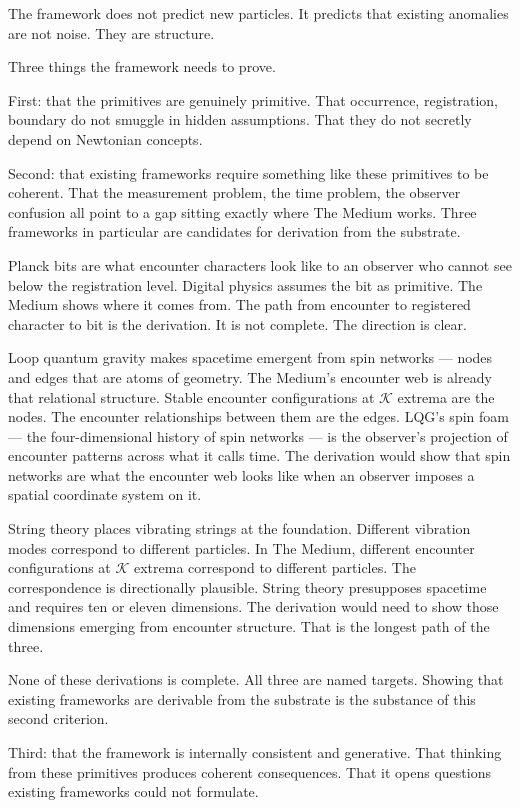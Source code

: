 \documentclass[11pt,letterpaper]{article}
\newcommand{\Kappa}{\mathcal{K}}
\begin{document}
The framework does not predict new particles. It predicts that existing anomalies are not noise. They are structure.

Three things the framework needs to prove.

First: that the primitives are genuinely primitive. That occurrence, registration, boundary do not smuggle in hidden assumptions. That they do not secretly depend on Newtonian concepts.

Second: that existing frameworks require something like these primitives to be coherent. That the measurement problem, the time problem, the observer confusion all point to a gap sitting exactly where The Medium works. Three frameworks in particular are candidates for derivation from the substrate.

Planck bits are what encounter characters look like to an observer who cannot see below the registration level. Digital physics assumes the bit as primitive. The Medium shows where it comes from. The path from encounter to registered character to bit is the derivation. It is not complete. The direction is clear.

Loop quantum gravity makes spacetime emergent from spin networks --- nodes and edges that are atoms of geometry. The Medium's encounter web is already that relational structure. Stable encounter configurations at \(\Kappa\) extrema are the nodes. The encounter relationships between them are the edges. LQG's spin foam --- the four-dimensional history of spin networks --- is the observer's projection of encounter patterns across what it calls time. The derivation would show that spin networks are what the encounter web looks like when an observer imposes a spatial coordinate system on it.

String theory places vibrating strings at the foundation. Different vibration modes correspond to different particles. In The Medium, different encounter configurations at \(\Kappa\) extrema correspond to different particles. The correspondence is directionally plausible. String theory presupposes spacetime and requires ten or eleven dimensions. The derivation would need to show those dimensions emerging from encounter structure. That is the longest path of the three.

None of these derivations is complete. All three are named targets. Showing that existing frameworks are derivable from the substrate is the substance of this second criterion.

Third: that the framework is internally consistent and generative. That thinking from these primitives produces coherent consequences. That it opens questions existing frameworks could not formulate.
\end{document}
